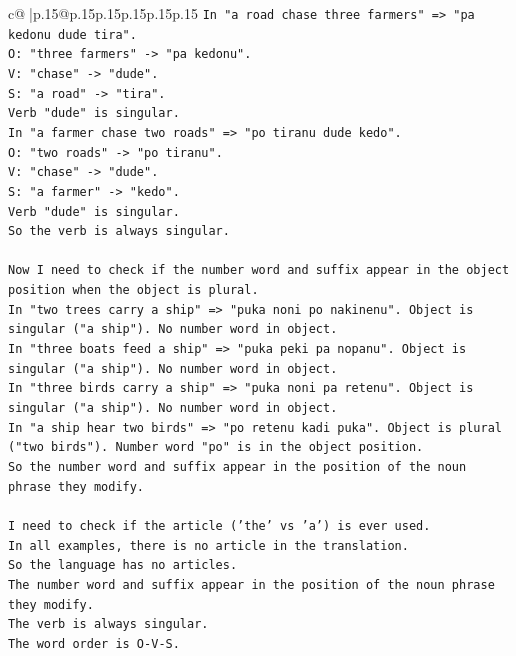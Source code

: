 \documentclass{article}
\begin{document}
{\begin{supertabular}{c@{$\;$}|p{.15\linewidth}@{}p{.15\linewidth}p{.15\linewidth}p{.15\linewidth}p{.15\linewidth}p{.15\linewidth}}
{{{\texttt{In "a road chase three farmers" => "pa kedonu dude tira".} \\
\texttt{O: "three farmers" {-}> "pa kedonu".} \\
\texttt{V: "chase" {-}> "dude".} \\
\texttt{S: "a road" {-}> "tira".} \\
\texttt{Verb "dude" is singular.} \\
\texttt{In "a farmer chase two roads" => "po tiranu dude kedo".} \\
\texttt{O: "two roads" {-}> "po tiranu".} \\
\texttt{V: "chase" {-}> "dude".} \\
\texttt{S: "a farmer" {-}> "kedo".} \\
\texttt{Verb "dude" is singular.} \\
\texttt{So the verb is always singular.} \\
\\ 
\texttt{Now I need to check if the number word and suffix appear in the object position when the object is plural.} \\
\texttt{In "two trees carry a ship" => "puka noni po nakinenu". Object is singular ("a ship"). No number word in object.} \\
\texttt{In "three boats feed a ship" => "puka peki pa nopanu". Object is singular ("a ship"). No number word in object.} \\
\texttt{In "three birds carry a ship" => "puka noni pa retenu". Object is singular ("a ship"). No number word in object.} \\
\texttt{In "a ship hear two birds" => "po retenu kadi puka". Object is plural ("two birds"). Number word "po" is in the object position.} \\
\texttt{So the number word and suffix appear in the position of the noun phrase they modify.} \\
\\ 
\texttt{I need to check if the article ('the' vs 'a') is ever used.} \\
\texttt{In all examples, there is no article in the translation.} \\
\texttt{So the language has no articles.} \\
\texttt{The number word and suffix appear in the position of the noun phrase they modify.} \\
\texttt{The verb is always singular.} \\
\texttt{The word order is O{-}V{-}S.} \\
\\ 
}}}
\end{supertabular}}
\end{document}
